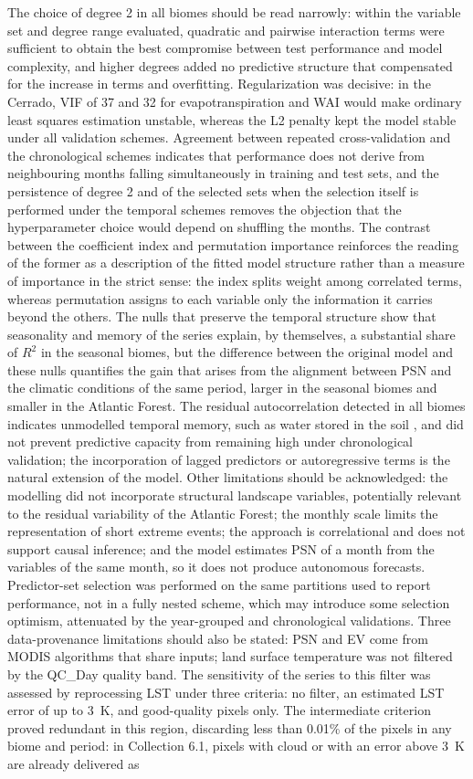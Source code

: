 \documentclass[a4paper,fleqn]{cas-dc}
\begin{document}
The choice of degree 2 in all biomes should be read narrowly: within the variable set and degree range evaluated, quadratic and pairwise interaction terms were sufficient to obtain the best compromise between test performance and model complexity, and higher degrees added no predictive structure that compensated for the increase in terms and overfitting. Regularization was decisive: in the Cerrado, VIF of 37 and 32 for evapotranspiration and WAI would make ordinary least squares estimation unstable, whereas the L2 penalty kept the model stable under all validation schemes. Agreement between repeated cross-validation and the chronological schemes indicates that performance does not derive from neighbouring months falling simultaneously in training and test sets, and the persistence of degree 2 and of the selected sets when the selection itself is performed under the temporal schemes removes the objection that the hyperparameter choice would depend on shuffling the months. The contrast between the coefficient index and permutation importance reinforces the reading of the former as a description of the fitted model structure rather than a measure of importance in the strict sense: the index splits weight among correlated terms, whereas permutation assigns to each variable only the information it carries beyond the others. The nulls that preserve the temporal structure show that seasonality and memory of the series explain, by themselves, a substantial share of $R^2$ in the seasonal biomes, but the difference between the original model and these nulls quantifies the gain that arises from the alignment between PSN and the climatic conditions of the same period, larger in the seasonal biomes and smaller in the Atlantic Forest. The residual autocorrelation detected in all biomes indicates unmodelled temporal memory, such as water stored in the soil \citep{oliveira2005}, and did not prevent predictive capacity from remaining high under chronological validation; the incorporation of lagged predictors or autoregressive terms is the natural extension of the model. Other limitations should be acknowledged: the modelling did not incorporate structural landscape variables, potentially relevant to the residual variability of the Atlantic Forest; the monthly scale limits the representation of short extreme events; the approach is correlational and does not support causal inference; and the model estimates PSN of a month from the variables of the same month, so it does not produce autonomous forecasts. Predictor-set selection was performed on the same partitions used to report performance, not in a fully nested scheme, which may introduce some selection optimism, attenuated by the year-grouped and chronological validations. Three data-provenance limitations should also be stated: PSN and EV come from MODIS algorithms that share inputs; land surface temperature was not filtered by the QC\_Day quality band. The sensitivity of the series to this filter was assessed by reprocessing LST under three criteria: no filter, an estimated LST error of up to 3~K, and good-quality pixels only. The intermediate criterion proved redundant in this region, discarding less than 0.01\% of the pixels in any biome and period: in Collection 6.1, pixels with cloud or with an error above 3~K are already delivered as 
\end{document}
